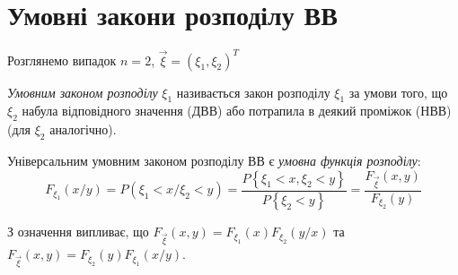 
\section{Умовні закони розподілу ВВ}

Розглянемо випадок $n = 2$, $\vec{\xi} = \left(\xi_1, \xi_2\right)^T$

\begin{definition}
    \emph{Умовним законом розподілу} $\xi_1$ називається закон розподілу 
    $\xi_1$ за умови того, що $\xi_2$ набула відповідного значення (ДВВ) 
    або потрапила в деякий проміжок (НВВ) (для $\xi_2$ аналогічно).
\end{definition}

\begin{definition}
    Універсальним умовним законом розподілу ВВ є \emph{умовна функція 
    розподілу}:
    \begin{equation*}
        F_{\xi_1}(x/y) = P({\xi_1 < x}/{\xi_2 < y}) = 
        \frac{P\left\{\xi_1 < x, \xi_2 < y\right\}}
        {P\left\{\xi_2 < y\right\}} = 
        \frac{F_{\vec{\xi}}(x, y)}{F_{\xi_2}(y)}
    \end{equation*}
\end{definition}
\begin{remark}
    З означення випливає, що 
    $F_{\vec{\xi}}(x,y) = F_{\xi_1}(x)F_{\xi_2}(y/x)$
    та 
    $F_{\vec{\xi}}(x,y) = F_{\xi_2}(y)F_{\xi_1}(x/y)$.
\end{remark}